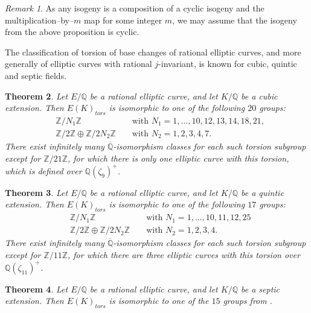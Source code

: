 \documentclass[10pt,leqno]{amsart}
\newcommand{\Z}{\mathbb{Z}}
\newcommand{\Q}{\mathbb{Q}}
\newtheorem{theorem}{Theorem}[]
\theoremstyle{definition}
\theoremstyle{remark}
\newtheorem{remark}[theorem]{Remark}
\numberwithin{theorem}{section}
\begin{document}
\begin{remark}
    As any isogeny is a composition of a cyclic isogeny and the multiplication--by--$m$ map for some integer $m$, we may assume that the isogeny from the above proposition is cyclic.
\end{remark}

The classification of torsion of base changes of rational elliptic curves, and more generally of elliptic curves with rational $j$-invariant, is known for cubic, quintic and septic fields.

\begin{theorem}\cite[Theorem 1.]{basechanges}\label{basechanges}
    Let $E/\Q$ be a rational elliptic curve, and let $K/\Q$ be a cubic extension. Then $E(K)_{tors}$ is isomorphic to one of the following $20$ groups:
      \begin{align*}
            &\Z/N_1\Z && \text{ with } N_1=1,\ldots,10,12,13,14,18,21, \\
            &\Z/2\Z\oplus \Z/2N_2\Z && \text{ with } N_2=1,2,3,4,7.
        \end{align*}
There exist infinitely many $\overline{\Q}$-isomorphism classes for each such torsion subgroup except for $\Z/21\Z$, for which there is only one elliptic curve with this torsion, which is defined over $\Q(\zeta_9)^+$.
\end{theorem}

\begin{theorem}\cite[Theorem 1]{alvaro-quintic}\label{basechanges5}
    Let $E/\Q$ be a rational elliptic curve, and let $K/\Q$ be a quintic extension. Then $E(K)_{tors}$ is isomorphic to one of the following $17$ groups:
      \begin{align*}
            &\Z/N_1\Z && \text{ with } N_1=1,\ldots,10,11,12,25 \\
            &\Z/2\Z\oplus \Z/2N_2\Z && \text{ with } N_2=1,2,3,4.
        \end{align*}
    There exist infinitely many $\overline{\Q}$-isomorphism classes for each such torsion subgroup except for $\Z/11\Z$, for which there are three elliptic curves with this torsion over $\Q(\zeta_{11})^+$.
\end{theorem}

\begin{theorem}\cite[follows from Proposition 7.7]{basechangesseptic}\label{basechanges7}
   Let $E/\Q$ be a rational elliptic curve, and let $K/\Q$ be a septic extension. Then $E(K)_{tors}$ is isomorphic to one of the $15$ groups from .
\end{theorem}
\end{document}
